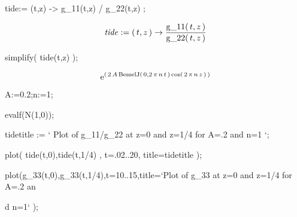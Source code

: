 \begin{mapleinput}
tide:= (t,z) -> g_11(t,z) / g_22(t,z) ;
\end{mapleinput}
\begin{maplelatex}
\[
{\it tide} := (\,{t}, {z}\,) \rightarrow {\displaystyle \frac {
{\rm g\_11}(\,{t}, {z}\,)}{{\rm g\_22}(\,{t}, {z}\,)}}
\]
\end{maplelatex}
\begin{mapleinput}
simplify( tide(t,z) );
\end{mapleinput}
\begin{maplelatex}
\[
{\rm e}^{(\,2\,{A}\,{\rm BesselJ}(\,0, 2\,{ \pi}\,{n}\,{t}\,)\,
{\rm cos}(\,2\,{ \pi}\,{n}\,{z}\,)\,)}
\]
\end{maplelatex}
\begin{mapleinput}
A:=0.2;n:=1;
\end{mapleinput}
\begin{mapleinput}
evalf(N(1,0));
\end{mapleinput}
\begin{mapleinput}
tidetitle := ` Plot of  g_11/g_22 at z=0 and z=1/4 for A=.2 and n=1 `;
\end{mapleinput}
\begin{mapleinput}
plot( {tide(t,0),tide(t,1/4)} , t=.02..20, title=tidetitle );
\end{mapleinput}
\begin{mapleinput}
plot({g_33(t,0),g_33(t,1/4)},t=10..15,title=`Plot of g_33 at z=0 and z=1/4 for A=.2 an
\end{mapleinput}
\begin{mapleinput}
d n=1` );
\end{mapleinput}
\begin{mapleinput}

\end{mapleinput}


